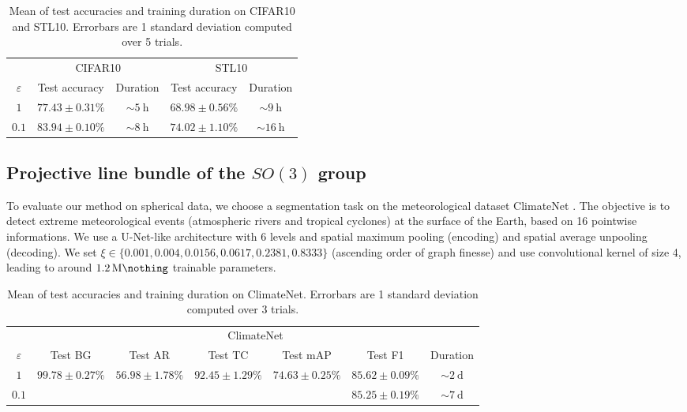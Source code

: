 \documentclass{article}
\begin{document}
\begin{table}[h!]
\centering 
\caption{Mean of test accuracies and training duration on CIFAR10 and STL10. Errorbars are 1 standard deviation computed over 5 trials.}
\begin{tabular}{c c c c c}
\toprule
 & \multicolumn{2}{c}{CIFAR10} & \multicolumn{2}{c}{STL10} \\
$\varepsilon$ & Test accuracy & Duration & Test accuracy & Duration \\
\midrule
$1$ & $77.43 \pm 0.31 \%$ & $\sim \SI{5}{\hour}$ & $68.98 \pm 0.56 \%$ & $\sim \SI{9}{\hour}$ \\
$0.1$ & $\boldsymbol{83.94 \pm 0.10 \%}$ & $\sim \SI{8}{\hour}$ & $\boldsymbol{74.02 \pm 1.10 \%}$ & $\sim \SI{16}{\hour}$ \\
\bottomrule
\end{tabular}
\end{table}

\subsection{Projective line bundle of the $SO(3)$ group}

To evaluate our method on spherical data, we choose a segmentation task on the meteorological dataset ClimateNet \citep{kashinath2021climatenet}. The objective is to detect extreme meteorological events (atmospheric rivers and tropical cyclones) at the surface of the Earth, based on 16 pointwise informations. We use a U-Net-like architecture \citep{ronneberger2015u} with 6 levels and spatial maximum pooling (encoding) and spatial average unpooling (decoding). We set $\xi \in \{0.001, 0.004, 0.0156, 0.0617, 0.2381, 0.8333\}$ (ascending order of graph finesse) and use convolutional kernel of size 4, leading to around $\SI{1.2}{\mega \nothing}$ trainable parameters. 

\begin{table}[h!]
\centering 
\caption{Mean of test accuracies and training duration on ClimateNet. Errorbars are 1 standard deviation computed over 3 trials.}
\begin{tabular}{c c c c c c c}
\toprule
 & \multicolumn{6}{c}{ClimateNet} \\
$\varepsilon$ & Test BG & Test AR & Test TC & Test mAP & Test F1 & Duration \\
\midrule
$1$ & $99.78 \pm 0.27 \%$ & $56.98 \pm 1.78 \%$ & $92.45 \pm 1.29 \%$ & $74.63 \pm 0.25 \%$ & $\boldsymbol{85.62 \pm 0.09 \%}$ & $\sim \SI{2}{\day}$ \\
$0.1$ & & & & & $85.25 \pm 0.19 \%$ & $\sim \SI{7}{\day}$ \\
\bottomrule
\end{tabular}
\end{table}
\end{document}
